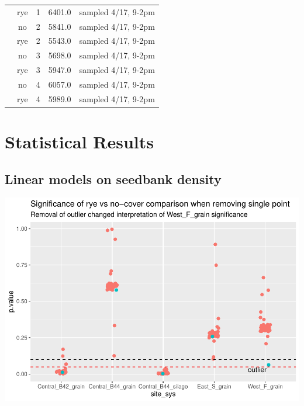 \documentclass[
]{article}
\begin{document}
\begin{table}[H]
\begin{tabular}[t]{ccccc}
\rowcolor{gray!6}   & rye & 1 & 6401.0 & sampled 4/17, 9-2pm\\

 & no & 2 & 5841.0 & sampled 4/17, 9-2pm\\

\rowcolor{gray!6}   & rye & 2 & 5543.0 & sampled 4/17, 9-2pm\\

 & no & 3 & 5698.0 & sampled 4/17, 9-2pm\\

\rowcolor{gray!6}   & rye & 3 & 5947.0 & sampled 4/17, 9-2pm\\

 & no & 4 & 6057.0 & sampled 4/17, 9-2pm\\

\rowcolor{gray!6}  \multirow[t]{-8}{*}{\centering\arraybackslash West} & rye & 4 & 5989.0 & sampled 4/17, 9-2pm\\
\bottomrule
\end{tabular}
\end{table}

\newpage

\hypertarget{statistical-results}{%
\section{Statistical Results}\label{statistical-results}}

\hypertarget{linear-models-on-seedbank-density}{%
\subsection{Linear models on seedbank
density}\label{linear-models-on-seedbank-density}}

\includegraphics{supp-mat_files/figure-latex/loo-1.pdf}
\end{document}
